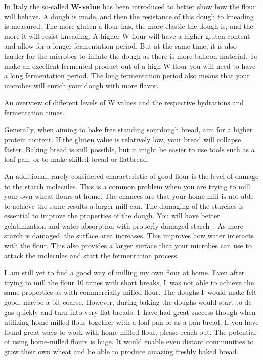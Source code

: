 In Italy the so-called
\textbf{W-value} has been introduced to better show how the flour will behave.
A dough is made, and then the resistance of this dough to kneading is measured.
The more gluten a flour has, the more elastic the dough is, and the more it will
resist kneading. A higher W flour will have a higher gluten content and allow for a longer
fermentation period. But at the same time, it is also harder for the microbes to
inflate the dough as there is more balloon material. To make an excellent fermented
product out of a high W flour you will need to have a long fermentation period.
The long fermentation period also means that your microbes will enrich
your dough with more flavor.

\begin{table}[!htb]
    \begin{center}
        
        \caption{An overview of different levels of W values and the
        respective hydrations and fermentation times.}%
        \label{tab:w-value}
    \end{center}
\end{table}

Generally, when aiming to
bake free standing sourdough bread, aim for a higher protein content. If the
gluten value is relatively low, your bread will collapse faster. Baking bread
is still possible, but it might be easier to use tools such as a loaf pan, or
to make skilled bread or flatbread.

An additional, rarely considered characteristic of good flour is the level of damage to the
starch molecules. This is a common problem when you are trying to mill your own wheat flours at
home. The chances are that your home mill is not able to achieve the same results
a larger mill can. The damaging of the starches is essential to improve the
properties of the dough. You will have better gelatinization and water
absorption with properly damaged starch~\cite{starch+damage+flour}. As more
starch is damaged, the surface area increases. This improves how water interacts with the flour.
This also provides a larger surface that your microbes can use to attack the molecules
and start the fermentation process.

I~am still
yet to find a good way of milling my own flour at home. Even after trying to
mill the flour 10 times with short breaks, I~was not able to achieve the same
properties as with commercially milled flour. The doughs I~would make felt
good, maybe a bit coarse. However, during baking the doughs would start to
de-gas quickly and turn into very flat breads. I~have had great success though when
utilizing home-milled flour together with a loaf pan or as a pan bread. If you
have found great ways to work with home-milled flour, please reach out. The potential
of using home-milled flours is huge. It would enable even distant communities
to grow their own wheat and be able to produce amazing freshly baked bread.

